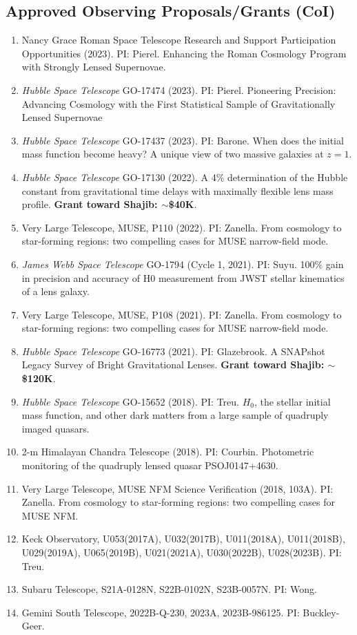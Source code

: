 \documentclass[margin, line]{res}
\begin{document}
\begin{resume}
\section{\sc Approved Observing Proposals/Grants (CoI)}
\begin{enumerate}
\item Nancy Grace Roman Space Telescope Research and Support Participation Opportunities (2023). PI: Pierel. Enhancing the Roman Cosmology Program with Strongly Lensed Supernovae.
\item \textit{Hubble Space Telescope} GO-17474 (2023). PI: Pierel. Pioneering Precision: Advancing Cosmology with the First Statistical Sample of Gravitationally Lensed Supernovae
\item \textit{Hubble Space Telescope} GO-17437 (2023). PI: Barone. When does the initial mass function become heavy? A unique view of two massive galaxies at $z=1$.
\item \textit{Hubble Space Telescope} GO-17130 (2022). A 4\% determination of the Hubble constant from gravitational time delays with maximally flexible lens mass profile. \textbf{Grant toward Shajib: $\sim$\$40K}.
\item Very Large Telescope, MUSE, P110 (2022). PI: Zanella. From cosmology to star-forming regions: two compelling cases for MUSE narrow-field mode.
\item \textit{James Webb Space Telescope} GO-1794 (Cycle 1, 2021). PI: Suyu. 100\% gain in precision and accuracy of H0 measurement from JWST stellar kinematics of a lens galaxy. 
\item Very Large Telescope, MUSE, P108 (2021). PI: Zanella. From cosmology to star-forming regions: two compelling cases for MUSE narrow-field mode.
\item \textit{Hubble Space Telescope} GO-16773 (2021). PI: Glazebrook. A SNAPshot Legacy Survey of Bright Gravitational Lenses. \textbf{Grant toward Shajib: $\sim$\$120K}.
\item \textit{Hubble Space Telescope} GO-15652 (2018). PI: Treu. $H_0$, the stellar initial mass function, and other dark matters from a large sample of quadruply imaged quasars.
\item 2-m Himalayan Chandra Telescope (2018). PI: Courbin. Photometric monitoring of the quadruply lensed quasar PSOJ0147+4630.
\item Very Large Telescope, MUSE NFM Science Verification (2018, 103A). PI: Zanella. From cosmology to star-forming regions: two compelling cases for MUSE NFM.
\item Keck Observatory, U053(2017A), U032(2017B), U011(2018A),  U011(2018B), U029(2019A), U065(2019B), U021(2021A), U030(2022B), U028(2023B). PI: Treu.
\item Subaru Telescope, S21A-0128N, S22B-0102N, S23B-0057N. PI: Wong.
\item Gemini South Telescope, 2022B-Q-230, 2023A, 2023B-986125. PI: Buckley-Geer.
\end{enumerate}



\end{resume}
\end{document}
